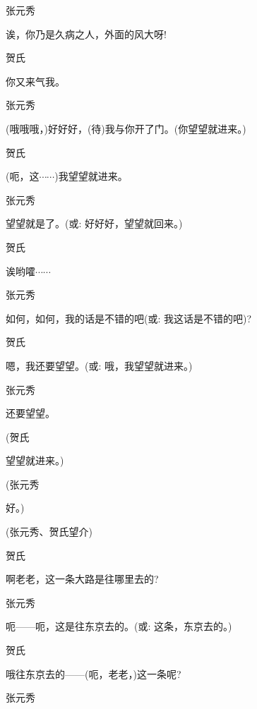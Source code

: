 张元秀\hspace{20pt}~

诶，你乃是久病之人，外面的风大呀!

贺氏\hspace{30pt}~

你又来气我。

张元秀\hspace{20pt}~

(哦哦哦，)好好好，(待)我与你开了门。(你望望就进来。)

贺氏\hspace{30pt}~

(呃，这$\cdots{}\cdots{}$)我望望就进来。

张元秀\hspace{20pt}~

望望就是了。({\akai 或}: 好好好，望望就回来。)

贺氏\hspace{30pt}~

诶哟嚯$\cdots{}\cdots{}$

张元秀\hspace{20pt}~

如何，如何，我的话是不错的吧({\akai 或}: 我这话是不错的吧)?

贺氏\hspace{30pt}~

嗯，我还要望望。({\akai 或}: 哦，我望望就进来。)

张元秀\hspace{20pt}~

还要望望。

(贺氏\hspace{30pt}~

望望就进来。)

(张元秀\hspace{20pt}~

好。)

(张元秀、贺氏望介)

贺氏\hspace{30pt}~

啊老老，这一条大路是往哪里去的?

张元秀\hspace{20pt}~

呃------呃，这是往东京去的。({\akai 或}: 这条，东京去的。)

贺氏\hspace{30pt}~

哦往东京去的------(呃，老老，)这一条呢?

张元秀\hspace{20pt}~


